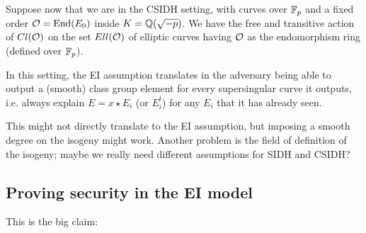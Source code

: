 Suppose now that we are in the CSIDH setting, with curves over $\mathbb{F}_p$ and a fixed order $\mathcal{O}=\operatorname{End}(E_0)$ inside $K=\mathbb{Q}(\sqrt{-p})$. We have the free and transitive action of $Cl(\mathcal{O})$ on the set $Ell(\mathcal{O})$ of elliptic curves having $\mathcal{O}$ as the endomorphism ring (defined over $\mathbb{F}_p$).

In this setting, the EI assumption translates in the adversary being able to output a (smooth) class group element for every supersingular curve it outputs, i.e. always explain $E=x\star E_i$ (or $E_i^t$) for any $E_i$ that it has already seen.

{\color{red} This might not directly translate to the EI assumption, but imposing a smooth degree on the isogeny might work. Another problem is the field of definition of the isogeny; maybe we really need different assumptions for SIDH and CSIDH?}

\subsection{Proving security in the EI model}
This is the big claim:

